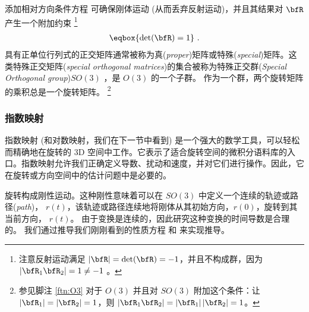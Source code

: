 添加相对方向条件方程  可确保刚体运动 (从而丢弃反射运动)，并且其结果对 $\bfR$ 产生一个附加约束%
\footnote{注意反射运动满足 $|\bfR|=\det(\bfR)=-1$，并且不构成群，因为 $|\bfR_1\bfR_2|=1\neq-1$ 。}
%
\begin{align}\label{equ:unitDet}
\eqbox{
\det(\bfR)=1
}
~.
\end{align}
%
%
具有正单位行列式的正交矩阵通常被称为真(\emph{proper})矩阵或特殊(\emph{special})矩阵。这类特殊正交矩阵(\emph{special orthogonal matrices})的集合被称为特殊正交群(\emph{Special Orthogonal group})$SO(3)$ ，是 $O(3)$ 的一个子群。
作为一个群，两个旋转矩阵的乘积总是一个旋转矩阵。%
\footnote{%
参见脚注 \ref{ftn:O3} 对于 $O(3)$ 并且对 $SO(3)$ 附加这个条件：让 $|\bfR_1|=|\bfR_2|=1$，则 $|\bfR_1\bfR_2|=|\bfR_1|\,|\bfR_2|=1$。}




\subsubsection{指数映射}

指数映射 (和对数映射，我们在下一节中看到) 是一个强大的数学工具，可以轻松而精确地在旋转的 3D 空间中工作。它表示了适合旋转空间的微积分语料库的入口。指数映射允许我们正确定义导数、扰动和速度，并对它们进行操作。因此，它在旋转或方向空间中的估计问题中是必要的。

旋转构成刚性运动。这种刚性意味着可以在 $SO(3)$ 中定义一个连续的轨迹或路径(\emph{path})， $r(t)$，该轨迹或路径连续地将刚体从其初始方向，$r(0)$，旋转到其当前方向， $r(t)$。
由于变换是连续的，因此研究这种变换的时间导数是合理的。
我们通过推导我们刚刚看到的性质方程  和  来实现推导。

